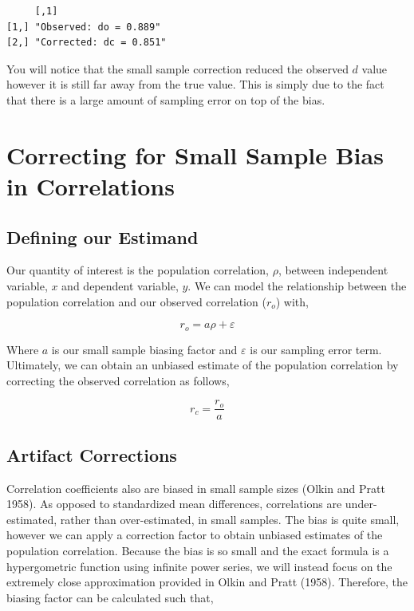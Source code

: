 \documentclass[
  letterpaper,
  DIV=11,
  numbers=noendperiod]{scrreprt}
\begin{document}
\begin{verbatim}
     [,1]                   
[1,] "Observed: do = 0.889" 
[2,] "Corrected: dc = 0.851"
\end{verbatim}

You will notice that the small sample correction reduced the observed
\(d\) value however it is still far away from the true value. This is
simply due to the fact that there is a large amount of sampling error on
top of the bias.

\hypertarget{correcting-for-small-sample-bias-in-correlations}{%
\section{Correcting for Small Sample Bias in
Correlations}\label{correcting-for-small-sample-bias-in-correlations}}

\hypertarget{defining-our-estimand-1}{%
\subsection{Defining our Estimand}\label{defining-our-estimand-1}}

Our quantity of interest is the population correlation, \(\rho\),
between independent variable, \(x\) and dependent variable, \(y\). We
can model the relationship between the population correlation and our
observed correlation (\(r_o\)) with,

\[
r_o = a\rho+\varepsilon
\]

Where \(a\) is our small sample biasing factor and \(\varepsilon\) is
our sampling error term. Ultimately, we can obtain an unbiased estimate
of the population correlation by correcting the observed correlation as
follows,

\[
r_c = \frac{r_o}{a}
\]

\hypertarget{artifact-corrections-1}{%
\subsection{Artifact Corrections}\label{artifact-corrections-1}}

Correlation coefficients also are biased in small sample sizes (Olkin
and Pratt 1958). As opposed to standardized mean differences,
correlations are under-estimated, rather than over-estimated, in small
samples. The bias is quite small, however we can apply a correction
factor to obtain unbiased estimates of the population correlation.
Because the bias is so small and the exact formula is a hypergometric
function using infinite power series, we will instead focus on the
extremely close approximation provided in Olkin and Pratt (1958).
Therefore, the biasing factor can be calculated such that,
\end{document}
